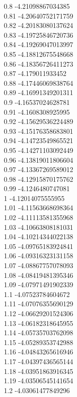{0.8	-4.21098867034385\\
0.81	-4.20640752171759\\
0.82	-4.20183080137624\\
0.83	-4.19725846720736\\
0.84	-4.19269047013997\\
0.85	-4.18812675548668\\
0.86	-4.18356726411273\\
0.87	-4.179011933452\\
0.88	-4.17446069838764\\
0.89	-4.16991349201311\\
0.9	-4.16537024628781\\
0.91	-4.1608308925995\\
0.92	-4.15629536224489\\
0.93	-4.15176358683801\\
0.94	-4.14723549865521\\
0.95	-4.14271103092449\\
0.96	-4.13819011806604\\
0.97	-4.13367269589012\\
0.98	-4.12915870175762\\
0.99	-4.1246480747081\\
1	-4.12014075555955\\
1.01	-4.11563668698364\\
1.02	-4.11113581355968\\
1.03	-4.10663808181031\\
1.04	-4.10214344022138\\
1.05	-4.09765183924841\\
1.06	-4.09316323131158\\
1.07	-4.08867757078093\\
1.08	-4.08419481395346\\
1.09	-4.07971491902339\\
1.1	-4.07523784604672\\
1.11	-4.07076355690129\\
1.12	-4.06629201524306\\
1.13	-4.06182318645955\\
1.14	-4.05735703762098\\
1.15	-4.05289353742988\\
1.16	-4.04843265616946\\
1.17	-4.04397436565144\\
1.18	-4.03951863916345\\
1.19	-4.03506545141654\\
1.2	-4.03061477849296\\
}
